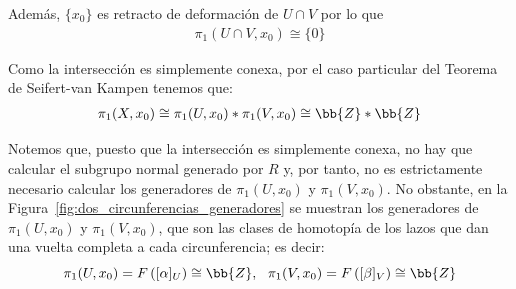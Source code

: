 \begin{ejemplo}
\begin{enumerate}
        Además, $\{x_0\}$ es retracto de deformación de $U\cap V$ por lo que 
        \begin{gather*}
            \pi_1(U\cap V,x_0) \cong \{0\}
        \end{gather*}

        Como la intersección es simplemente conexa, por el caso particular del Teorema de Seifert-van Kampen tenemos que:
        \begin{gather*}
            \pi_1(X,x_0) \cong \pi_1(U,x_0) \ast \pi_1(V,x_0) \cong \bb{Z} \ast \bb{Z}
        \end{gather*}

        Notemos que, puesto que la intersección es simplemente conexa, no hay que calcular el subgrupo normal generado por $R$ y, por tanto, no es estrictamente necesario calcular los generadores de $\pi_1(U,x_0)$ y $\pi_1(V,x_0)$. No obstante, en la Figura~\ref{fig:dos_circunferencias_generadores} se muestran los generadores de $\pi_1(U,x_0)$ y $\pi_1(V,x_0)$, que son las clases de homotopía de los lazos que dan una vuelta completa a cada circunferencia; es decir:
        \begin{equation*}
            \pi_1(U,x_0) = F\left([\alpha]_U\right)\cong \bb{Z},\ \ \pi_1(V,x_0) = F\left([\beta]_V\right)\cong \bb{Z}
        \end{equation*}
        \begin{figure}[ht]
            \centering
\end{figure}
\end{enumerate}
\end{ejemplo}
